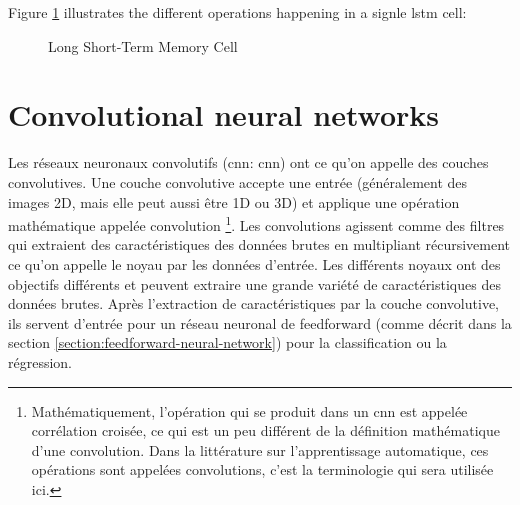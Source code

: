 Figure \ref{fig:lstm} illustrates the different operations happening in a signle \acrshort{lstm} cell:

\begin{figure}[h]
    \centering
    
    \caption{Long Short-Term Memory Cell}
    \label{fig:lstm}
\end{figure}

\section{Convolutional neural networks}
\label{section:cnn}
Les réseaux neuronaux convolutifs (\acrlong{cnn}: \acrshort{cnn}) ont ce qu'on appelle des couches convolutives. Une couche convolutive accepte une entrée (généralement des images 2D, mais elle peut aussi être 1D ou 3D) et applique une opération mathématique appelée convolution \footnote{Mathématiquement, l'opération qui se produit dans un \acrshort{cnn} est appelée corrélation croisée, ce qui est un peu différent de la définition mathématique d'une convolution. Dans la littérature sur l'apprentissage automatique, ces opérations sont appelées convolutions, c'est la terminologie qui sera utilisée ici.}. Les convolutions agissent comme des filtres qui extraient des caractéristiques des données brutes en multipliant récursivement ce qu'on appelle le noyau par les données d'entrée.
Les différents noyaux ont des objectifs différents et peuvent extraire une grande variété de caractéristiques des données brutes. Après l'extraction de caractéristiques par la couche convolutive, ils servent d'entrée pour un réseau neuronal de feedforward (comme décrit dans la section \ref{section:feedforward-neural-network}) pour la classification ou la régression.



